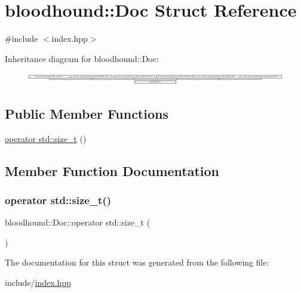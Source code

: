 \hypertarget{structbloodhound_1_1Doc}{}\section{bloodhound\+:\+:Doc Struct Reference}
\label{structbloodhound_1_1Doc}


{\ttfamily \#include $<$index.\+hpp$>$}

Inheritance diagram for bloodhound\+:\+:Doc\+:\begin{figure}[H]
\begin{center}
\leavevmode
\includegraphics[height=0.514233cm]{structbloodhound_1_1Doc}
\end{center}
\end{figure}
\subsection*{Public Member Functions}
\begin{DoxyCompactItemize}
\item 
\hyperlink{structbloodhound_1_1Doc_ad27bc07db7657c653075bf8e02191172}{operator std\+::size\+\_\+t} ()
\end{DoxyCompactItemize}


\subsection{Member Function Documentation}
\mbox{\label{structbloodhound_1_1Doc_ad27bc07db7657c653075bf8e02191172}} 
\subsubsection{\texorpdfstring{operator std\+::size\+\_\+t()}{operator std::size\_t()}}
{\footnotesize\ttfamily bloodhound\+::\+Doc\+::operator std\+::size\+\_\+t (\begin{DoxyParamCaption}{ }\end{DoxyParamCaption})\hspace{0.3cm}{\ttfamily [inline]}}



The documentation for this struct was generated from the following file\+:\begin{DoxyCompactItemize}
\item 
include/\hyperlink{index_8hpp}{index.\+hpp}\end{DoxyCompactItemize}
